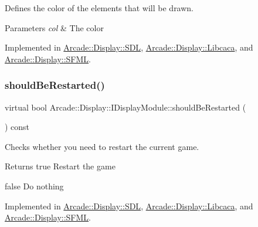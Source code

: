 Defines the color of the elements that will be drawn. 


\begin{DoxyParams}{Parameters}
{\em col} & The color \\
\hline
\end{DoxyParams}


Implemented in \mbox{\hyperlink{classArcade_1_1Display_1_1SDL_a061a0536f59a8a27a370c9d39bf2f39f}{Arcade\+::\+Display\+::\+S\+DL}}, \mbox{\hyperlink{classArcade_1_1Display_1_1Libcaca_aec7af72c1ffd1a3af05b4d8cf3edf84e}{Arcade\+::\+Display\+::\+Libcaca}}, and \mbox{\hyperlink{classArcade_1_1Display_1_1SFML_a20555c4dd9cf956c5ffae5acab8e79b2}{Arcade\+::\+Display\+::\+S\+F\+ML}}.

\mbox{\label{classArcade_1_1Display_1_1IDisplayModule_adc5d499229aa5899bbd4bae14f00cb27}} 
\subsubsection{\texorpdfstring{shouldBeRestarted()}{shouldBeRestarted()}}
{\footnotesize\ttfamily virtual bool Arcade\+::\+Display\+::\+I\+Display\+Module\+::should\+Be\+Restarted (\begin{DoxyParamCaption}{ }\end{DoxyParamCaption}) const\hspace{0.3cm}{\ttfamily [pure virtual]}}



Checks whether you need to restart the current game. 

\begin{DoxyReturn}{Returns}
true Restart the game 

false Do nothing 
\end{DoxyReturn}


Implemented in \mbox{\hyperlink{classArcade_1_1Display_1_1SDL_aaeeb1aa505c0eab3c8b5c34265c89845}{Arcade\+::\+Display\+::\+S\+DL}}, \mbox{\hyperlink{classArcade_1_1Display_1_1Libcaca_acccbe7d671cc860dded39937073d2298}{Arcade\+::\+Display\+::\+Libcaca}}, and \mbox{\hyperlink{classArcade_1_1Display_1_1SFML_a7c276ccbf48700092eb637d73b78e0d1}{Arcade\+::\+Display\+::\+S\+F\+ML}}.

\mbox{\label{classArcade_1_1Display_1_1IDisplayModule_a550877fb92d58325404b9ebe9e71f6ff}} 
